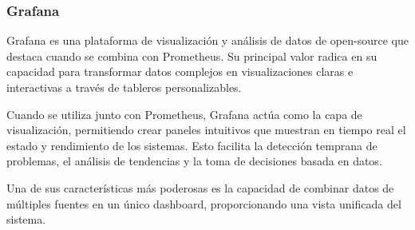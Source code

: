 \subsubsection{Grafana}
Grafana es una plataforma de visualización y análisis de datos de open-source que destaca cuando se combina con Prometheus. 
Su principal valor radica en su capacidad para transformar datos complejos en visualizaciones claras e interactivas a través de tableros personalizables.\newline

Cuando se utiliza junto con Prometheus, Grafana actúa como la capa de visualización, permitiendo crear paneles intuitivos que muestran en tiempo real el estado y rendimiento de los sistemas. 
Esto facilita la detección temprana de problemas, el análisis de tendencias y la toma de decisiones basada en datos. \newline

Una de sus características más poderosas es la capacidad de combinar datos de múltiples fuentes en un único dashboard, proporcionando una vista unificada del sistema. 

\newpage